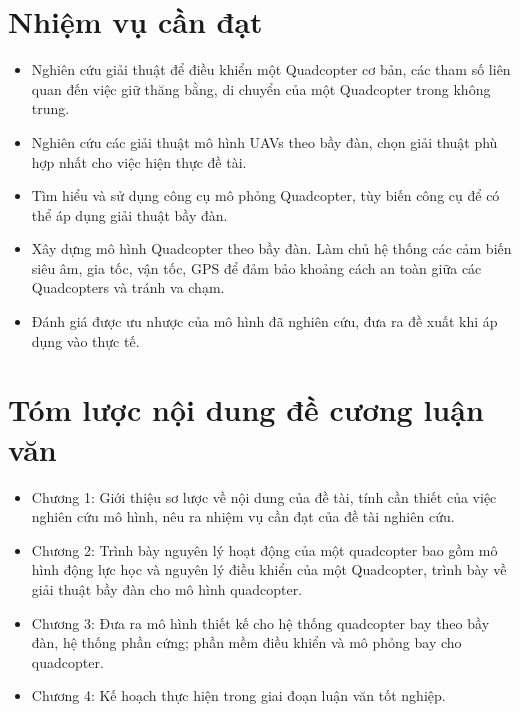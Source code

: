     \section{Nhiệm vụ cần đạt}
    \begin{itemize}
        \item Nghiên cứu giải thuật để điều khiển một Quadcopter cơ bản, các tham số liên quan đến việc giữ thăng bằng, di chuyển của một Quadcopter trong không trung.
        \item Nghiên cứu các giải thuật mô hình UAVs theo bầy đàn, chọn giải thuật phù hợp nhất cho việc hiện thực đề tài.
        \item Tìm hiểu và sử dụng công cụ mô phỏng Quadcopter, tùy biến công cụ để có thể áp dụng giải thuật bầy đàn.
        \item Xây dựng mô hình Quadcopter theo bầy đàn. Làm chủ hệ thống các cảm biến siêu âm, gia tốc, vận tốc, GPS để đảm bảo khoảng cách an toàn giữa các Quadcopters và tránh va chạm.
        \item Đánh giá được ưu nhược của mô hình đã nghiên cứu, đưa ra đề xuất khi áp dụng vào thực tế.
    \end{itemize}

    \section{Tóm lược nội dung đề cương luận văn}
        \begin{itemize}
            \item Chương 1: Giới thiệu sơ lược về nội dung của đề tài, tính cần thiết của việc nghiên cứu mô hình, nêu ra nhiệm vụ cần đạt của đề tài nghiên cứu.
            \item Chương 2: Trình bày nguyên lý hoạt động của một quadcopter bao gồm mô hình động lực học và nguyên lý điều khiển của một Quadcopter, trình bày về giải thuật bầy đàn cho mô hình quadcopter.
            \item Chương 3: Đưa ra mô hình thiết kế cho hệ thống quadcopter bay theo bầy đàn, hệ thống phần cứng; phần mềm điều khiển và mô phỏng bay cho quadcopter.
            \item Chương 4: Kế hoạch thực hiện trong giai đoạn luận văn tốt nghiệp.
        \end{itemize}

